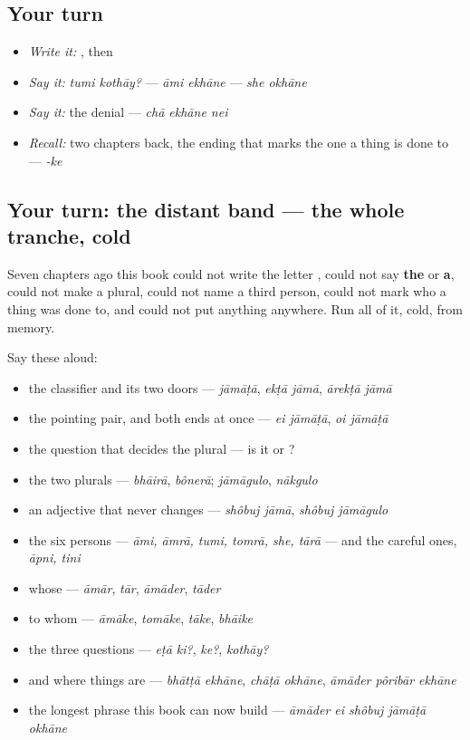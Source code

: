 \subsection*{Your turn}
\begin{itemize}
\raggedright
  \item \emph{Write it:} , then 
  \item \emph{Say it:} \emph{tumi kothāy?} — \emph{āmi ekhāne} — \emph{she okhāne}
  \item \emph{Say it:} the denial — \emph{chā ekhāne nei}
  \item \emph{Recall:} two chapters back, the ending that marks the one a thing is done to — \emph{-ke}
\end{itemize}

\subsection*{Your turn: the distant band — the whole tranche, cold}
Seven chapters ago this book could not write the letter \textbf{}, could not say \textbf{the} or \textbf{a}, could not make a plural, could not name a third person, could not mark who a thing was done to, and could not put anything anywhere. Run all of it, cold, from memory.

Say these aloud:

\begin{itemize}
\raggedright
  \item the classifier and its two doors — \emph{jāmāṭā}, \emph{ekṭā jāmā}, \emph{ārekṭā jāmā}
  \item the pointing pair, and both ends at once — \emph{ei jāmāṭā}, \emph{oi jāmāṭā}
  \item the question that decides the plural — is it \textbf{} or \textbf{}?
  \item the two plurals — \emph{bhāirā}, \emph{bônerā}; \emph{jāmāgulo}, \emph{nākgulo}
  \item an adjective that never changes — \emph{shôbuj jāmā}, \emph{shôbuj jāmāgulo}
  \item the six persons — \emph{āmi, āmrā, tumi, tomrā, she, tārā} — and the careful ones, \emph{āpni, tini}
  \item whose — \emph{āmār}, \emph{tār}, \emph{āmāder}, \emph{tāder}
  \item to whom — \emph{āmāke}, \emph{tomāke}, \emph{tāke}, \emph{bhāike}
  \item the three questions — \emph{eṭā ki?}, \emph{ke?}, \emph{kothāy?}
  \item and where things are — \emph{bhātṭā ekhāne}, \emph{chāṭā okhāne}, \emph{āmāder pôribār ekhāne}
  \item the longest phrase this book can now build — \emph{āmāder ei shôbuj jāmāṭā okhāne}
\end{itemize}

